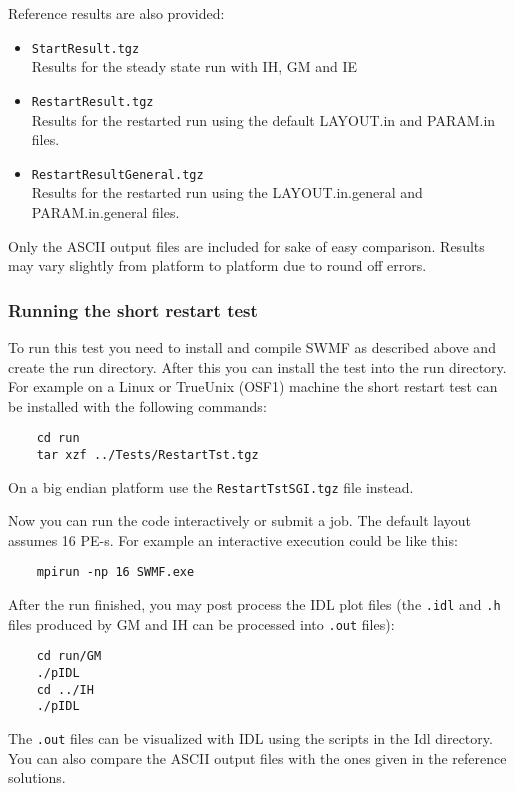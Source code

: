 Reference results are also  provided:
\begin{itemize}
\item {\tt StartResult.tgz}\\
       Results for the steady state run with IH, GM and IE

\item {\tt RestartResult.tgz}\\
      Results for the restarted run using the default
       LAYOUT.in and PARAM.in files.

\item {\tt RestartResultGeneral.tgz}\\
      Results for the restarted run using the 
      LAYOUT.in.general and PARAM.in.general files.
\end{itemize}
Only the ASCII output files are included for sake of easy comparison.
Results may vary slightly from platform to platform due to round off errors.

\subsubsection{Running the short restart test}

To run this test you need to install and compile SWMF as described
above and create the run directory. After this you can install the
test into the run directory.  For example on a Linux or TrueUnix
(OSF1) machine the short restart test can be installed with the
following commands:
\begin{verbatim}
	cd run
	tar xzf ../Tests/RestartTst.tgz
\end{verbatim}
On a big endian platform use the {\tt RestartTstSGI.tgz} file instead.

Now you can run the code interactively or submit a job.  The default
layout assumes 16 PE-s. For example an interactive execution could be
like this:
\begin{verbatim}
	mpirun -np 16 SWMF.exe
\end{verbatim}
After the run finished, you may post process the IDL plot files (the
{\tt .idl} and {\tt .h} files produced by GM and IH can be processed
into {\tt .out} files):
\begin{verbatim}
	cd run/GM
	./pIDL
	cd ../IH
	./pIDL
\end{verbatim}
The {\tt .out} files can be visualized with IDL using the scripts in
the Idl directory.  You can also compare the ASCII output files with
the ones given in the reference solutions.

